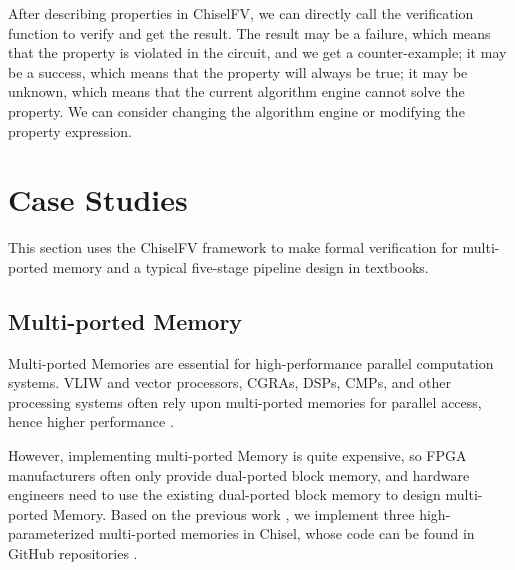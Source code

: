 \documentclass[conference]{IEEEtran}
\theoremstyle{definition}
\begin{document}
After describing properties in ChiselFV, we can directly call the verification function to verify and get the result.
The result may be a failure, which means that the property is violated in the circuit, and we get a counter-example; 
it may be a success, which means that the property will always be true; 
it may be unknown, which means that the current algorithm engine cannot solve the property. We can consider changing the algorithm engine or modifying the property expression.

\section{Case Studies}

This section uses the ChiselFV framework to make formal verification for multi-ported memory and a typical five-stage pipeline design in textbooks.

\subsection{Multi-ported Memory}

Multi-ported Memories are essential for high-performance parallel computation systems. VLIW and vector processors, CGRAs, DSPs, CMPs, and other processing systems often rely upon multi-ported memories for parallel access, hence higher performance \cite{abdelhadi2014modular}. 

However, implementing multi-ported Memory is quite expensive, so FPGA manufacturers often only provide dual-ported block memory, and hardware engineers need to use the existing dual-ported block memory to design multi-ported Memory. 
Based on the previous work \cite{xiang2022parameterized}, we implement three high-parameterized multi-ported memories in Chisel, whose code can be found in GitHub repositories \cite{mpMemory}.
\end{document}
